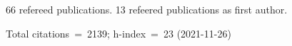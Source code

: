 66 refereed publications. 13 refeered publications as first author.

Total citations~=~2139; h-index~=~23 (2021-11-26)